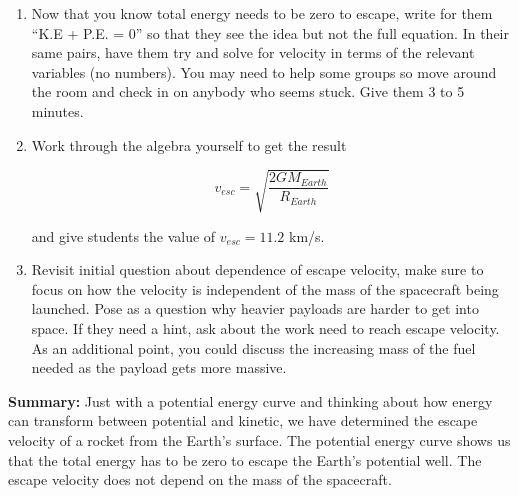 \documentclass{article}
\begin{document}
\begin{enumerate}
\item Now that you know total energy needs to be zero to escape, write for them ``K.E + P.E. = 0'' so that they see the idea but not the full equation. In their same pairs, have them try and solve for velocity in terms of the relevant variables (no numbers). You may need to help some groups so move around the room and check in on anybody who seems stuck. Give them 3 to 5 minutes.

\item Work through the algebra yourself to get the result

\begin{equation}
v_{esc} = \sqrt{\frac{2 G M_{Earth}}{R_{Earth}}}
\end{equation}

and give students the value of $v_{esc} = 11.2$ km/s.

\item Revisit initial question about dependence of escape velocity, make sure to focus on how the velocity is independent of the mass of the spacecraft being launched. Pose as a question why heavier payloads are harder to get into space. If they need a hint, ask about the work need to reach escape velocity. As an additional point, you could discuss the increasing mass of the fuel needed as the payload gets more massive.
\end{enumerate}

\textbf{Summary:} Just with a potential energy curve and thinking about how energy can transform between potential and kinetic, we have determined the escape velocity of a rocket from the Earth's surface. The potential energy curve shows us that the total energy has to be zero to escape the Earth's potential well. The escape velocity does not depend on the mass of the spacecraft.

\hspace{14pt}
\end{document}
